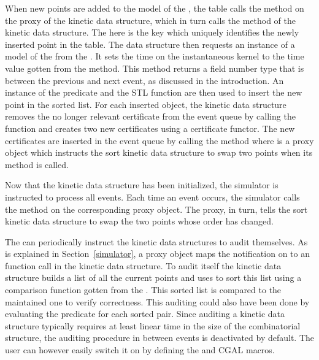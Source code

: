 When new points are added to the model of the
, the table calls the
 method on the proxy of the kinetic data
structure, which in turn calls the  method of
the kinetic data structure. The  here is the key which
uniquely identifies the newly inserted point in the table. The data
structure then requests an instance of a model of the
 from the
.  It sets the time on the
instantaneous kernel to the time value gotten from the
 method. This method
returns a field number type that is between the previous and next
event, as discussed in the introduction. An instance of the
 predicate and the STL
function  are then used to insert the new
point in the sorted list. For each inserted object, the kinetic data
structure removes the no longer relevant certificate from the event
queue by calling the 
function and creates two new certificates using a
 certificate functor. The new
certificates are inserted in the event queue by calling the
 method where
 is a proxy object which instructs the sort
kinetic data structure to swap two points when its 
method is called.

Now that the kinetic data structure has been initialized, the
simulator is instructed to process all events. Each time an event
occurs, the simulator calls the  method on the
corresponding proxy object. The proxy, in turn, tells the sort kinetic
data structure to swap the two points whose order has changed.

The  can periodically instruct the kinetic data
structures to audit themselves.  As is explained in
Section~\ref{simulator}, a proxy object maps the notification on to an
 function call in the kinetic data structure. To audit
itself the kinetic data structure builds a list of all the current
points and uses  to sort this list using a
comparison function gotten from the .
This sorted list is compared to the maintained one to verify
correctness. This auditing could also have been done by evaluating the
 predicate for each sorted pair.  Since
auditing a kinetic data structure typically requires at least linear
time in the size of the combinatorial structure, the auditing
procedure in between events is deactivated by default.  The user can
however easily switch it on by defining the
 and  CGAL
macros.

